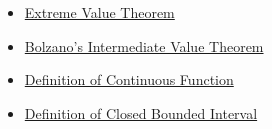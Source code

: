\begin{dependencies}
\begin{itemize}
  \item \hyperref[thm:extreme-value-theorem]{Extreme Value Theorem}
  \item \hyperref[thm:bolzano-intermediate-value]{Bolzano's Intermediate Value Theorem}
  \item \hyperref[def:continuous-function]{Definition of Continuous Function}
  \item \hyperref[def:closed-bounded-interval]{Definition of Closed Bounded Interval}
\end{itemize}
\end{dependencies}

\clearpage
